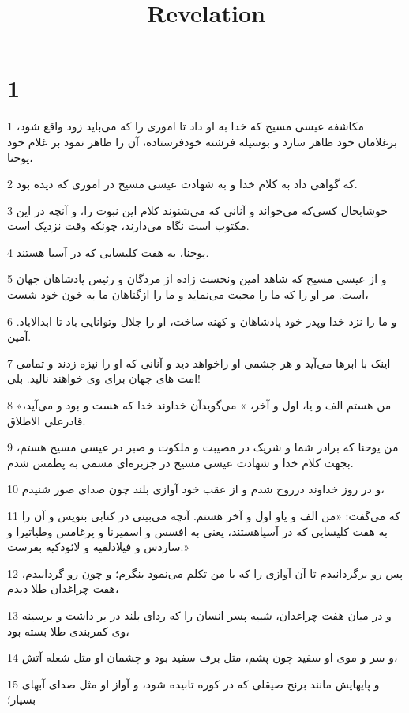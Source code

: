 

\title{Revelation}


\chapter{1}

\par 1 مکاشفه عیسی مسیح که خدا به او داد تا اموری را که می‌باید زود واقع شود، برغلامان خود ظاهر سازد و بوسیله فرشته خودفرستاده، آن را ظاهر نمود بر غلام خود یوحنا،
\par 2 که گواهی داد به کلام خدا و به شهادت عیسی مسیح در اموری که دیده بود.
\par 3 خوشابحال کسی‌که می‌خواند و آنانی که می‌شنوند کلام این نبوت را، و آنچه در این مکتوب است نگاه می‌دارند، چونکه وقت نزدیک است.
\par 4 یوحنا، به هفت کلیسایی که در آسیا هستند.
\par 5 و از عیسی مسیح که شاهد امین ونخست زاده از مردگان و رئیس پادشاهان جهان است. مر او را که ما را محبت می‌نماید و ما را ازگناهان ما به خون خود شست،
\par 6 و ما را نزد خدا وپدر خود پادشاهان و کهنه ساخت، او را جلال وتوانایی باد تا ابدالاباد. آمین.
\par 7 اینک با ابرها می‌آید و هر چشمی او راخواهد دید و آنانی که او را نیزه زدند و تمامی امت های جهان برای وی خواهند نالید. بلی!
\par 8 «من هستم الف و یا، اول و آخر، » می‌گویدآن خداوند خدا که هست و بود و می‌آید، قادرعلی الاطلاق.
\par 9 من یوحنا که برادر شما و شریک در مصیبت و ملکوت و صبر در عیسی مسیح هستم، بجهت کلام خدا و شهادت عیسی مسیح در جزیره‌ای مسمی به پطمس شدم.
\par 10 و در روز خداوند درروح شدم و از عقب خود آوازی بلند چون صدای صور شنیدم،
\par 11 که می‌گفت: «من الف و یاو اول و آخر هستم. آنچه می‌بینی در کتابی بنویس و آن را به هفت کلیسایی که در آسیاهستند، یعنی به افسس و اسمیرنا و پرغامس وطیاتیرا و ساردس و فیلادلفیه و لائودکیه بفرست.»
\par 12 پس رو برگردانیدم تا آن آوازی را که با من تکلم می‌نمود بنگرم؛ و چون رو گردانیدم، هفت چراغدان طلا دیدم،
\par 13 و در میان هفت چراغدان، شبیه پسر انسان را که ردای بلند در بر داشت و برسینه وی کمربندی طلا بسته بود،
\par 14 و سر و موی او سفید چون پشم، مثل برف سفید بود و چشمان او مثل شعله آتش،
\par 15 و پایهایش مانند برنج صیقلی که در کوره تابیده شود، و آواز او مثل صدای آبهای بسیار؛
